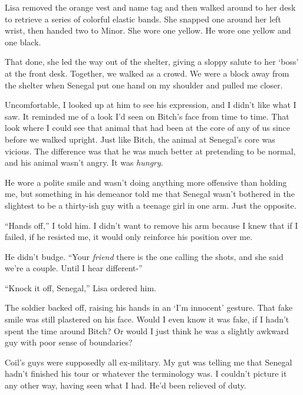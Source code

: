 Lisa removed the orange vest and name tag and then walked around to her desk to retrieve a series of colorful elastic bands.  She snapped one around her left wrist, then handed two to Minor.  She wore one yellow.  He wore one yellow and one black.



That done, she led the way out of the shelter, giving a sloppy salute to her `boss' at the front desk.  Together, we walked as a crowd.  We were a block away from the shelter when Senegal put one hand on my shoulder and pulled me closer.



Uncomfortable, I looked up at him to see his expression, and I didn't like what I saw.  It reminded me of a look I'd seen on Bitch's face from time to time.  That look where I could see that animal that had been at the core of any of us since before we walked upright.  Just like Bitch, the animal at Senegal's core was vicious.  The difference was that he was much better at pretending to be normal, and his animal wasn't angry.  It was \emph{hungry}.



He wore a polite smile and wasn't doing anything more offensive than holding me, but something in his demeanor told me that Senegal wasn't bothered in the slightest to be a thirty-ish guy with a teenage girl in one arm.  Just the opposite.



``Hands off,'' I told him.  I didn't want to remove his arm because I knew that if I failed, if he resisted me, it would only reinforce his position over me.



He didn't budge.  ``Your \emph{friend} there is the one calling the shots, and she said we're a couple.  Until I hear different-''



``Knock it off, Senegal,'' Lisa ordered him.



The soldier backed off, raising his hands in an `I'm innocent' gesture.  That fake smile was still plastered on his face.  Would I even know it was fake, if I hadn't spent the time around Bitch?  Or would I just think he was a slightly awkward guy with poor sense of boundaries?



Coil's guys were supposedly all ex-military.  My gut was telling me that Senegal hadn't finished his tour or whatever the terminology was.  I couldn't picture it any other way, having seen what I had.  He'd been relieved of duty.



